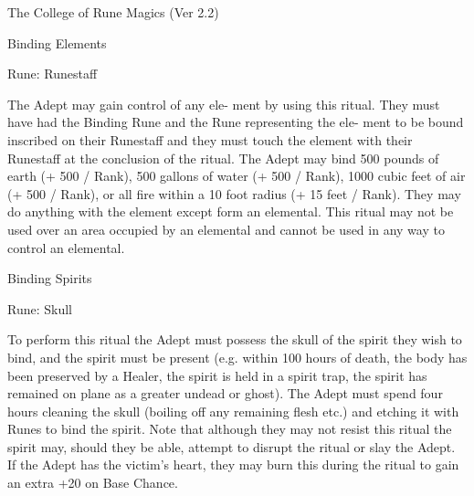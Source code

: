 \begin{Chapter}{The College of Rune Magics (Ver 2.2)}
\begin{ritual}[R-1]{Binding Elements }

Rune: Runestaff 
\begin{effects}
 The  Adept  may  gain  control  of  any  ele-
ment  by  using  this  ritual.  They  must  have  had  the 
Binding  Rune  and  the  Rune  representing  the  ele-
ment to be bound inscribed on their Runestaff and 
they must touch the element with their Runestaff at 
the  conclusion  of  the  ritual.  The  Adept  may  bind 
500 pounds of earth (+ 500 / Rank), 500 gallons of 
water (+ 500 / Rank), 1000 cubic feet of air (+ 500 
/ Rank), or all fire within a 10 foot radius (+ 15 feet 
/  Rank).  They  may  do  anything  with  the  element 
except  form  an  elemental.  This  ritual  may  not  be 
used  over  an  area  occupied  by  an  elemental  and 
cannot be used in any way to control an elemental. 

\end{effects}
\end{ritual}

\begin{ritual}[R-2]{Binding Spirits }

Rune: Skull 
\begin{effects}
 To  perform  this  ritual  the  Adept  must 
possess the skull of the spirit they wish to bind, and 
the spirit must be present (e.g. within 100 hours of 
death, the body has been preserved by a Healer, the 
spirit is held in a spirit trap, the spirit has remained 
on plane as a greater undead or ghost). The Adept 
must  spend  four  hours  cleaning  the  skull  (boiling 
off  any  remaining  flesh  etc.)  and  etching  it  with 
Runes  to  bind  the  spirit.  Note  that  although  they 
may not resist this ritual the spirit may, should they 
be  able,  attempt  to  disrupt  the  ritual  or  slay  the 
Adept.  If  the  Adept  has  the  victim’s  heart,  they 
may burn this during the ritual to gain an extra +20 
on Base Chance. 


\end{effects}
\end{ritual}
\end{Chapter}
